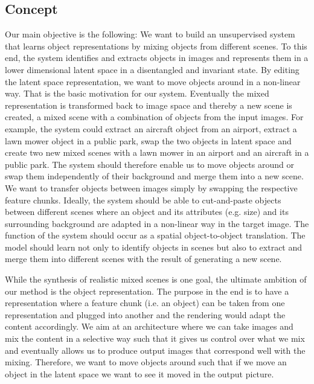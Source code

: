 \documentclass[12pt,a4paper]{article}
\begin{document}
\subsection{Concept}
Our main objective is the following: We want to build an unsupervised system that learns object representations by mixing objects from different scenes. To this end, the system identifies and extracts objects in images and represents them in a lower dimensional latent space in a disentangled and invariant state. By editing the latent space representation, we want to move objects around in a non-linear way. That is the basic motivation for our system. Eventually the mixed representation is transformed back to image space and thereby a new scene is created, a mixed scene with a combination of objects from the input images. For example, the system could extract an aircraft object from an airport, extract a lawn mower object in a public park, swap the two objects in latent space and create two new mixed scenes with a lawn mower in an airport and an aircraft in a public park. 
The system should therefore enable us to move objects around or swap them independently of their background and merge them into a new scene. We want to transfer objects between images simply by swapping the respective feature chunks. Ideally, the system should be able to cut-and-paste objects between different scenes where an object and its attributes (e.g. size) and its surrounding background are adapted in a non-linear way in the target image. The function of the system should occur as a spatial object-to-object translation. The model should learn not only to identify objects in scenes but also to extract and merge them into different scenes with the result of generating a new scene. 

While the synthesis of realistic mixed scenes is one goal, the ultimate ambition of our method is the object representation. The purpose in the end is to have a representation where a feature chunk (i.e. an object) can be taken from one representation and plugged into another and the rendering would adapt the content accordingly. We aim at an architecture where we can take images and mix the content in a selective way such that it gives us control over what we mix and eventually allows us to produce output images that correspond well with the mixing. Therefore, we want to move objects around such that if we move an object in the latent space we want to see it moved in the output picture. 
\end{document}

